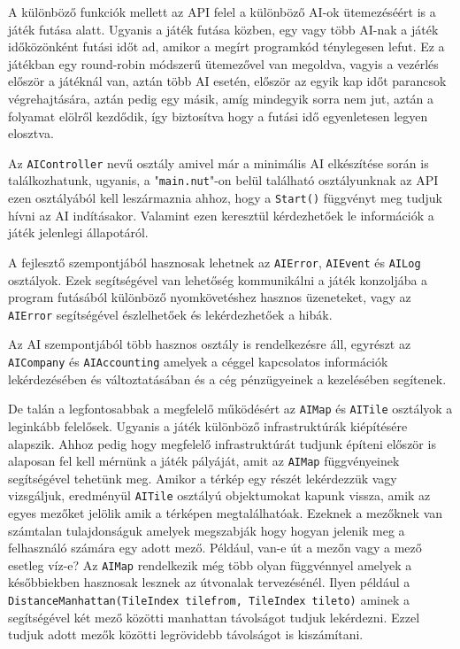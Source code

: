 A különböző funkciók mellett az API felel a különböző AI-ok ütemezéséért is a játék futása alatt. Ugyanis a játék futása közben, egy vagy több AI-nak a játék időközönként futási időt ad, amikor a megírt programkód ténylegesen lefut. Ez a játékban egy round-robin módszerű ütemezővel van megoldva, vagyis a vezérlés először a játéknál van, aztán több AI esetén, először az egyik kap időt parancsok végrehajtására, aztán pedig egy másik, amíg mindegyik sorra nem jut, aztán a folyamat elölről kezdődik, így biztosítva hogy a futási idő egyenletesen legyen elosztva.

Az \texttt{AIController} nevű osztály amivel már a minimális AI elkészítése során is találkozhatunk, ugyanis, a "\texttt{main.nut}"-on belül található osztályunknak az API ezen osztályából kell leszármaznia ahhoz, hogy a \texttt{Start()} függvényt meg tudjuk hívni az AI indításakor. Valamint ezen keresztül kérdezhetőek le információk a játék jelenlegi állapotáról.

A fejlesztő szempontjából hasznosak lehetnek az \texttt{AIError}, \texttt{AIEvent} és \texttt{AILog} osztályok. Ezek segítségével van lehetőség kommunikálni a játék konzoljába a program futásából különböző nyomkövetéshez hasznos üzeneteket, vagy az \texttt{AIError} segítségével észlelhetőek és lekérdezhetőek a hibák.

Az AI szempontjából több hasznos osztály is rendelkezésre áll, egyrészt az \\ \texttt{AICompany} és \texttt{AIAccounting} amelyek a céggel kapcsolatos információk lekérdezésében és változtatásában és a cég pénzügyeinek a kezelésében segítenek.

De talán a legfontosabbak a megfelelő működésért az \texttt{AIMap} és \texttt{AITile} osztályok a leginkább felelősek. Ugyanis a játék különböző infrastruktúrák kiépítésére alapszik. Ahhoz pedig hogy megfelelő infrastruktúrát tudjunk építeni először is alaposan fel kell mérnünk a játék pályáját, amit az \texttt{AIMap} függvényeinek segítségével tehetünk meg. Amikor a térkép egy részét lekérdezzük vagy vizsgáljuk, eredményül \texttt{AITile} osztályú objektumokat kapunk vissza, amik az egyes mezőket jelölik amik a térképen megtalálhatóak. Ezeknek a mezőknek van számtalan tulajdonságuk amelyek megszabják hogy hogyan jelenik meg a felhasználó számára egy adott mező. Például, van-e út a mezőn vagy a mező esetleg víz-e? Az \texttt{AIMap} rendelkezik még több olyan függvénnyel amelyek a későbbiekben hasznosak lesznek az útvonalak tervezésénél. Ilyen például a \texttt{DistanceManhattan(TileIndex tilefrom, TileIndex tileto)} aminek a segítségével két mező közötti manhattan távolságot tudjuk lekérdezni. Ezzel tudjuk adott mezők közötti legrövidebb távolságot is kiszámítani.

